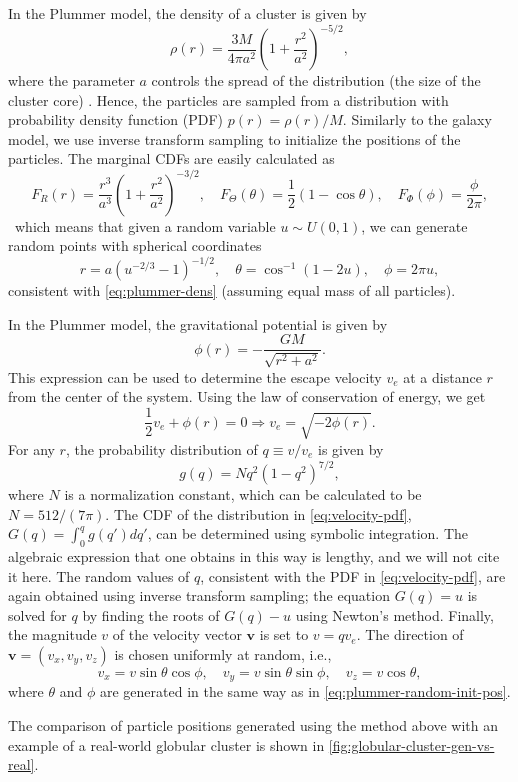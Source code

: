 In the Plummer model, the density of a cluster is given by
\begin{equation}\label{eq:plummer-dens}
    \rho(r) = \frac{3M}{4\pi a^2}\left(1 + \frac{r^2}{a^2} \right)^{-5/2},
\end{equation}
where the parameter $a$ controls the spread of the distribution (the size of the cluster core) \cite{Aarseth1974Comparison}.
Hence, the particles are sampled from a distribution with probability density function (PDF) $p(r) = \rho(r) / M$.
Similarly to the galaxy model, we use inverse transform sampling to initialize the positions of the particles.
The marginal CDFs are easily calculated as
\begin{equation*}
    F_R(r) = \frac{r^3}{a^3}\left( 1+\frac{r^2}{a^2} \right)^{-3/2}, \quad
    F_\Theta (\theta) = \frac{1}{2}(1-\cos\theta), \quad
    F_\Phi (\phi) = \frac{\phi}{2\pi},
\end{equation*}\
which means that given a random variable $u\sim U(0, 1)$, we can generate random points with spherical coordinates
\begin{equation}\label{eq:plummer-random-init-pos}
    r = a(u^{-2/3}-1)^{-1/2}, \quad \theta = \cos^{-1}(1-2u), \quad \phi = 2\pi u,
\end{equation}
consistent with \autoref{eq:plummer-dens} (assuming equal mass of all particles).

In the Plummer model, the gravitational potential is given by
\begin{equation*}
    \phi(r) = -\frac{GM}{\sqrt{r^2 + a^2}}.
\end{equation*}
This expression can be used to determine the escape velocity \( v_e \) at a distance \( r \) from the center of the system.
Using the law of conservation of energy, we get
\begin{equation*}
    \frac{1}{2}v_e + \phi(r) = 0 \Rightarrow v_e = \sqrt{-2\phi(r)}.
\end{equation*}
For any $r$, the probability distribution of $q \equiv v/v_e$ is given by \cite{Aarseth1974Comparison}
\begin{equation}\label{eq:velocity-pdf}
    g(q) = N q^2(1-q^2)^{7/2},
\end{equation}
where $N$ is a normalization constant, which can be calculated to be $N = 512 / (7\pi)$.
The CDF of the distribution in \autoref{eq:velocity-pdf}, $G(q) = \int_0^q g(q') dq'$, can be determined using symbolic integration.
The algebraic expression that one obtains in this way is lengthy, and we will not cite it here.
The random values of $q$, consistent with the PDF in \autoref{eq:velocity-pdf}, are again obtained using inverse transform sampling;
the equation $G(q) = u$ is solved for $q$ by finding the roots of $G(q) - u$ using Newton's method.
Finally, the magnitude $v$ of the velocity vector $\mathbf{v}$ is set to $v = qv_e$.
The direction of $\mathbf{v} = (v_x, v_y, v_z)$ is chosen uniformly at random, i.e.,
\begin{equation*}
    v_x = v\sin\theta \cos\phi, \quad v_y = v\sin\theta\sin\phi, \quad v_z = v\cos\theta,
\end{equation*}
where $\theta$ and $\phi$ are generated in the same way as in \autoref{eq:plummer-random-init-pos}.

The comparison of particle positions generated using the method above with an example of a real-world globular cluster is shown in \autoref{fig:globular-cluster-gen-vs-real}.
